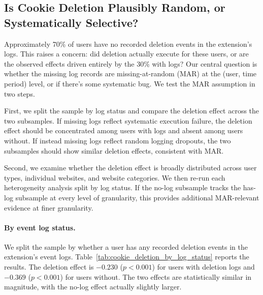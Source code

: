 \documentclass[12pt]{article}
\theoremstyle{definition}
\theoremstyle{remark}
\begin{document}
\begin{appendix}
\subsection{Is Cookie Deletion Plausibly Random, or Systematically Selective?}\label{subsec:deletion_plausibly_random}

Approximately 70\% of users have no recorded deletion events in the extension's logs. This raises a concern: did deletion actually execute for these users, or are the observed effects driven entirely by the 30\% with logs? Our central question is whether the missing log records are missing-at-random (MAR) at the (user, time period) level, or if there's some systematic bug.  We test the MAR assumption in two steps.

First, we split the sample by log status and compare the deletion effect across the two subsamples. If missing logs reflect systematic execution failure, the deletion effect should be concentrated among users with logs and absent among users without. If instead missing logs reflect random logging dropouts, the two subsamples should show similar deletion effects, consistent with MAR.

Second, we examine whether the deletion effect is broadly distributed across user types, individual websites, and website categories. We then re-run each heterogeneity analysis split by log status. If the no-log subsample tracks the has-log subsample at every level of granularity, this provides additional MAR-relevant evidence at finer granularity.

\paragraph{By event log status.} We split the sample by whether a user has any recorded deletion events in the extension's event logs. Table~\ref{tab:cookie_deletion_by_log_status} reports the results. The deletion effect is $-0.230$ ($p < 0.001$) for users with deletion logs and $-0.369$ ($p < 0.001$) for users without. The two effects are statistically similar in magnitude, with the no-log effect actually slightly larger.


\end{appendix}
\end{document}
